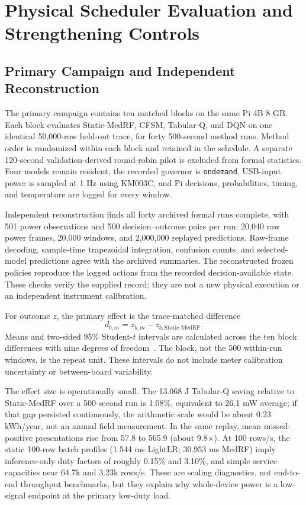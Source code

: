 \section{Physical Scheduler Evaluation and Strengthening Controls}
\subsection{Primary Campaign and Independent Reconstruction}
The primary campaign contains ten matched blocks on the same Pi 4B 8 GB. Each block evaluates Static-MedRF, CFSM, Tabular-Q, and DQN on one identical 50,000-row held-out trace, for forty 500-second method runs. Method order is randomized within each block and retained in the schedule. A separate 120-second validation-derived round-robin pilot is excluded from formal statistics. Four models remain resident, the recorded governor is \texttt{ondemand}, USB-input power is sampled at 1 Hz using KM003C, and Pi decisions, probabilities, timing, and temperature are logged for every window.

Independent reconstruction finds all forty archived formal runs complete, with 501 power observations and 500 decision--outcome pairs per run: 20,040 raw power frames, 20,000 windows, and 2,000,000 replayed predictions. Raw-frame decoding, sample-time trapezoidal integration, confusion counts, and selected-model predictions agree with the archived summaries. The reconstructed frozen policies reproduce the logged actions from the recorded decision-available state. These checks verify the supplied record; they are not a new physical execution or an independent instrument calibration.

For outcome $z$, the primary effect is the trace-matched difference
\begin{equation}
 d_{b,m}=z_{b,m}-z_{b,\mathrm{Static\mbox{-}MedRF}}.
\end{equation}
Means and two-sided 95\% Student-$t$ intervals are calculated across the ten block differences with nine degrees of freedom~\cite{NISTPaired}. The block, not the 500 within-run windows, is the repeat unit. These intervals do not include meter calibration uncertainty or between-board variability.

The effect size is operationally small. The 13.068 J Tabular-Q saving relative to Static-MedRF over a 500-second run is 1.08\%, equivalent to 26.1 mW average; if that gap persisted continuously, the arithmetic scale would be about 0.23 kWh/year, not an annual field measurement. In the same replay, mean missed-positive presentations rise from 57.8 to 565.9 (about 9.8$\times$). At 100 rows/s, the static 100-row batch profiles (1.544 ms LightLR; 30.953 ms MedRF) imply inference-only duty factors of roughly 0.15\% and 3.10\%, and simple service capacities near 64.7k and 3.23k rows/s. These are scaling diagnostics, not end-to-end throughput benchmarks, but they explain why whole-device power is a low-signal endpoint at the primary low-duty load.

